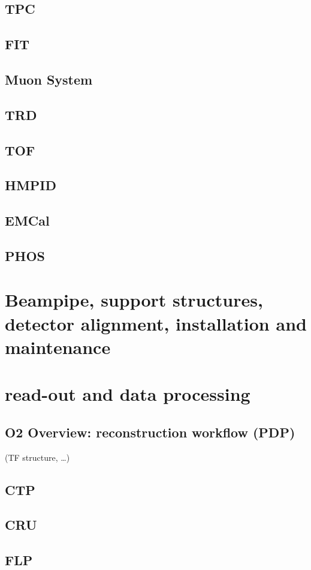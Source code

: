 \documentclass[ALICE,manyauthors]{cernphprep}
\begin{document}
\subsection{TPC}
\subsection{FIT}
\subsection{Muon System}
\subsection{TRD}
\subsection{TOF}
\subsection{HMPID}
\subsection{EMCal}
\subsection{PHOS}

\section{Beampipe, support structures, detector alignment, installation and maintenance}

\section{read-out and data processing}
\subsection{O2 Overview: reconstruction workflow (PDP)}
(TF structure, …)
\subsection{CTP}
\subsection{CRU}
\subsection{FLP}
\end{document}
